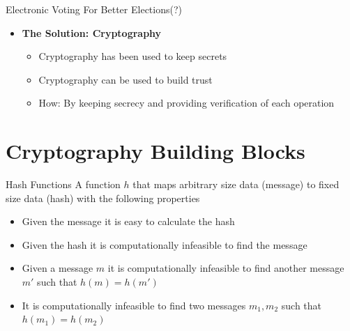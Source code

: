 \documentclass{beamer}
\newcommand*{\addsp}{\usebeamertemplate*{section page1}}
\begin{document}
\begin{frame}[allowframebreaks]{Electronic Voting For Better Elections(?)}
\begin{itemize}
\item \textbf{The Solution: Cryptography}
\begin{itemize}
\item Cryptography has been used to keep secrets
\item Cryptography can be used to build trust
\item How: By keeping secrecy and providing verification of each operation
\end{itemize}
\end{itemize}
\end{frame}

\section{Cryptography Building Blocks}
\begin{frame}
\addsp
\end{frame}

\begin{frame}{Hash Functions}
A function $h$ that maps arbitrary size data (message) to fixed size data (hash) with the following properties
\begin{itemize}
\item Given the message it is easy to calculate the hash
\item Given the hash it is computationally infeasible to find the message
\item Given a message $m$ it is computationally infeasible to find another message $m'$ such that $h(m)=h(m')$
\item It is computationally infeasible to find two messages $m_1,m_2$ such that $h(m_1)=h(m_2)$
\end{itemize}

\end{frame}
\end{document}
